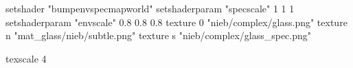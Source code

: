 setshader "bumpenvspecmapworld"
setshaderparam "specscale" 1 1 1
setshaderparam "envscale"  0.8 0.8 0.8
   texture 0 "nieb/complex/glass.png"
   texture n "mat_glass/nieb/subtle.png"
   texture s "nieb/complex/glass_spec.png"

texscale 4